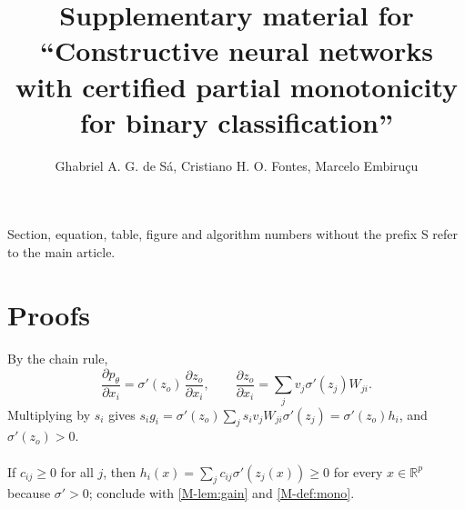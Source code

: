 \documentclass[11pt,a4paper]{article}
\title{Supplementary material for\\ ``Constructive neural networks with certified partial monotonicity for binary
classification''}
\author{Ghabriel A. G. de Sá, Cristiano H. O. Fontes, Marcelo Embiruçu}
\date{}
\newcommand{\R}{\mathbb{R}}
\newcommand{\sig}{\sigma}
\begin{document}
\maketitle

\noindent Section, equation, table, figure and algorithm numbers without the prefix S refer to the main article.

\section{Proofs}\label{sup:proofs}

\paragraph{}
By the chain rule,
\[
\frac{\partial p_\theta}{\partial x_i}=\sig'(z_o)\,\frac{\partial z_o}{\partial x_i},\qquad
\frac{\partial z_o}{\partial x_i}=\sum_j v_j\sig'(z_j)W_{ji}.
\]
Multiplying by $s_i$ gives $s_ig_i=\sig'(z_o)\sum_j s_iv_jW_{ji}\sig'(z_j)=\sig'(z_o)h_i$, and $\sig'(z_o)>0$.

\paragraph{}
If $c_{ij}\ge0$ for all $j$, then $h_i(x)=\sum_jc_{ij}\sig'(z_j(x))\ge0$ for every $x\in\R^p$ because $\sig'>0$;
conclude with \cref{M-lem:gain} and \cref{M-def:mono}.
\end{document}
